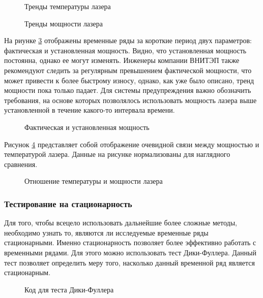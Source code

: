 \begin{figure}[H]
    \caption{Тренды температуры лазера}
    \label{tempdiv}
\end{figure}

\begin{figure}[H]
    \caption{Тренды мощности лазера}
    \label{powerdiv}
\end{figure}


На риунке \ref{checkpower} отображены временные
ряды за короткие период двух параметров: фактическая и установленная мощность.
Видно, что установленная мощность постоянна, однако ее могут изменять.
Инженеры компании ВНИТЭП также рекомендуют следить
за регулярным превышением фактической мощности,
что может привести к более быстрому износу,
однако, как уже было описано,
тренд мощности пока только падает.
Для системы предупреждения важно обозначить требования,
на основе которых позволялось использовать мощность
лазера выше установленной в течение какого-то интервала времени.


\begin{figure}[H]
    \caption{Фактическая и установленная мощность}
    \label{checkpower}
\end{figure}


Рисунок \ref{powertemp} представляет собой отображение
очевидной связи между мощностью и температурой лазера.
Данные на рисунке нормализованы для наглядного сравнения.

\begin{figure}[H]
    \caption{Отношение температуры и мощности лазера}
    \label{powertemp}
\end{figure}


\subsubsection{Тестирование на стационарность}

Для того, чтобы всецело использовать дальнейшие более сложные методы,
необходимо узнать то, являются ли исследуемые
временные ряды стационарными.
Именно стационарность позволяет
более эффективно работать с временными рядами.
Для этого можно использовать тест Дики-Фуллера.
Данный тест позволяет определить меру того,
насколько данный временной ряд является стационарным.

\begin{figure}[H]
    \caption{Код для теста Дики-Фуллера}
    \label{fuller}
\end{figure}

